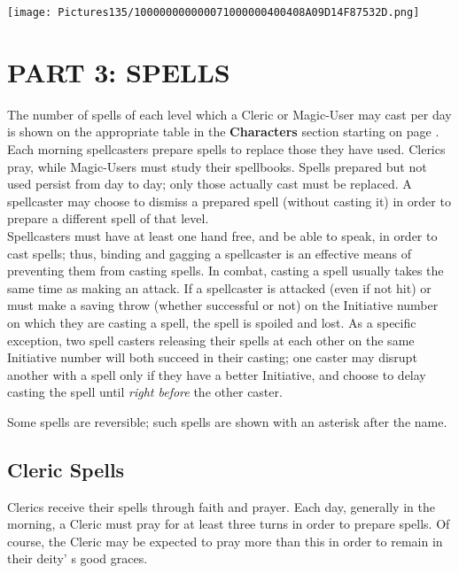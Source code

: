 \documentclass[a4paper,twoside,openany,10pt]{book}
\begin{document}
\vfill

\texttt{[image: Pictures135/100000000000071000000400408A09D14F87532D.png]}

\pagebreak

\section{PART 3: SPELLS}\label{part-3-spells}

\begin{multicols}{2}
	
The number of spells of each level which a Cleric or Magic-User may cast
per day is shown on the appropriate table in the \textbf{Characters} section starting on page \hyperlink{part-2-player-characters}{\pageref{part-2-player-characters}}. Each morning spellcasters prepare spells to replace those they have used. Clerics pray, while Magic-Users must study their spellbooks. Spells prepared but not used persist from day to day; only those actually cast must be replaced. A spellcaster may choose to dismiss a prepared spell (without casting it) in order to prepare a different spell of that level.\\

Spellcasters must have at least one hand free, and be able to speak, in order to cast spells; thus, binding and gagging a spellcaster is an effective means of preventing them from casting spells. In combat, casting a spell usually takes the same time as making an attack. If a spellcaster is attacked (even if not hit) or must make a saving throw (whether successful or not) on the Initiative number on which they are casting a spell, the spell is spoiled and lost. As a specific exception, two spell casters releasing their spells at each other on the same Initiative number will both succeed in their casting; one caster may disrupt another with a spell only if they have a better Initiative, and choose to delay casting the spell until \emph{right before} the other caster.

Some spells are reversible; such spells are shown with an asterisk after the name.

\subsection{Cleric Spells}\label{cleric-spells}

Clerics receive their spells through faith and prayer. Each day, generally in the morning, a Cleric must pray for at least three turns in order to prepare spells. Of course, the Cleric may be expected to pray more than this in order to remain in their deity' s good graces.


\end{multicols}
\end{document}
